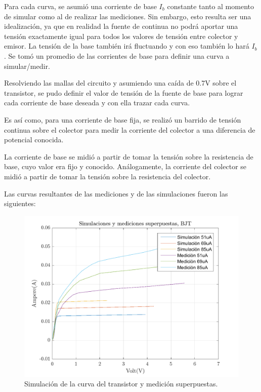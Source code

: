 \documentclass[../../e1_tp1_main.tex]{subfiles}
\begin{document}
	Para cada curva, se asumió una corriente de base $I_b$ constante tanto al momento de simular como al de realizar las mediciones. Sin embargo, esto resulta ser una idealización, ya que en realidad la fuente de continua no podrá aportar una tensión exactamente igual para todos los valores de tensión entre colector y emisor. La tensión de la base también irá fluctuando y con eso también lo hará $I_b$. Se tomó un promedio de las corrientes de base para definir una curva a simular/medir.\par
	Resolviendo las mallas del circuito y asumiendo una caída de 0.7V sobre el transistor, se pudo definir el valor de tensión de la fuente de base para lograr cada corriente de base deseada y con ella trazar cada curva.\par
	Es así como, para una corriente de base fija, se realizó un barrido de tensión continua sobre el colector para medir la corriente del colector a una diferencia de potencial conocida.\par
	La corriente de base se midió a partir de tomar la tensión sobre la resistencia de base, cuyo valor era fijo y conocido. Análogamente, la corriente del colector se midió a partir de tomar la tensión sobre la resistencia del colector.\par
	
	Las curvas resultantes de las mediciones y de las simulaciones fueron las siguientes:	
	
		\begin{figure}[H]	%
		\centering
		\includegraphics[scale=0.2]{imagenes/transistor_simulacion_medicion.png}
		\caption{Simulación de la curva del transistor y medición superpuestas.}
		\label{fig:ej5_transistor_simulacion_medicion}
	\end{figure}
	
\end{document}

